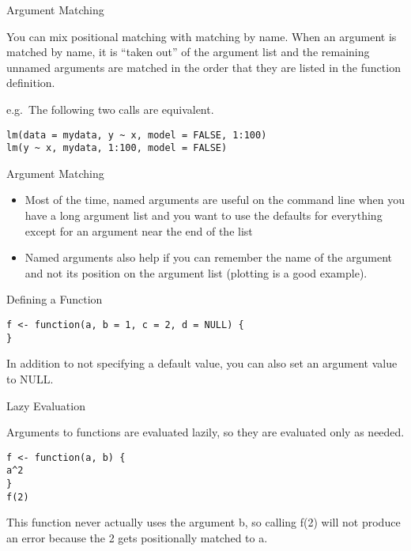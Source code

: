 \begin{frame}[fragile]{Argument Matching}

You can mix positional matching with matching by name. When an argument
is matched by name, it is ``taken out'' of the argument list and the
remaining unnamed arguments are matched in the order that they are
listed in the function definition.

e.g.~The following two calls are equivalent.

\begin{verbatim}
lm(data = mydata, y ~ x, model = FALSE, 1:100)
lm(y ~ x, mydata, 1:100, model = FALSE)
\end{verbatim}

\end{frame}

\begin{frame}{Argument Matching}

\begin{itemize}
\item
  Most of the time, named arguments are useful on the command line when
  you have a long argument list and you want to use the defaults for
  everything except for an argument near the end of the list
\item
  Named arguments also help if you can remember the name of the argument
  and not its position on the argument list (plotting is a good
  example).
\end{itemize}

\end{frame}

\begin{frame}[fragile]{Defining a Function}

\begin{verbatim}
f <- function(a, b = 1, c = 2, d = NULL) {
}
\end{verbatim}

In addition to not specifying a default value, you can also set an
argument value to NULL.

\end{frame}

\begin{frame}[fragile]{Lazy Evaluation}

Arguments to functions are evaluated lazily, so they are evaluated only
as needed.

\begin{verbatim}
f <- function(a, b) {
a^2
}
f(2)
\end{verbatim}

This function never actually uses the argument b, so calling f(2) will
not produce an error because the 2 gets positionally matched to a.

\end{frame}

